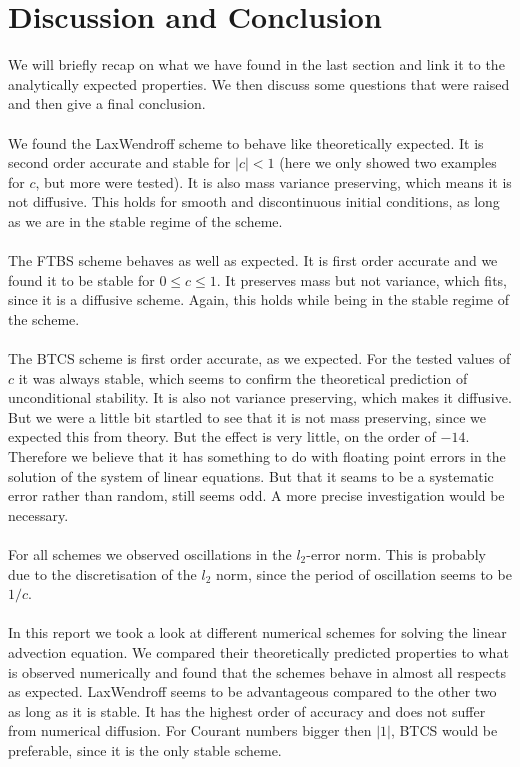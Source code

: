 \section{Discussion and Conclusion}\label{ch:discussion}
We will briefly recap on what we have found in the last section and link it to the analytically expected properties. We then discuss some questions that were raised and then give a final conclusion. \\ \\
We found the LaxWendroff scheme to behave like theoretically expected. It is second order accurate and stable for $|c|<1$ (here we only showed two examples for $c$, but more were tested). It is also mass variance preserving, which means it is not diffusive. This holds for smooth and discontinuous initial conditions, as long as we are in the stable regime of the scheme. \\ \\
The FTBS scheme behaves as well as expected. It is first order accurate and we found it to be stable for $0\leq c \leq 1 $. It preserves mass but not variance, which fits, since it is a diffusive scheme. Again, this holds while being in the stable regime of the scheme.  \\ \\
The BTCS scheme is first order accurate, as we expected. For the tested values of $c$ it was always stable, which seems to confirm the theoretical prediction of unconditional stability. It is also not variance preserving, which makes it diffusive.\\
 But we were a little bit startled to see that it is not mass preserving, since we expected this from theory. But the effect is very little, on the order of $-14$. Therefore we believe that it has something to do with floating point errors in the solution of the system of linear equations. But that it seams to be a systematic error rather than random, still seems odd. A more precise investigation would be necessary. \\ \\
 For all schemes we observed oscillations in the $l_2$-error norm. This is probably due to the discretisation of the $l_2$ norm, since the period of oscillation seems to be $1/c$. \\ \\
 
 In this report we took a look at different numerical schemes for solving the linear advection equation. We compared their theoretically predicted properties to what is observed numerically and found that the schemes behave in almost all respects as expected. LaxWendroff seems to be advantageous compared to the other two as long as it is stable. It has the highest order of accuracy and does not suffer from numerical diffusion. For Courant numbers bigger then $|1|$, BTCS would be preferable, since it is the only stable scheme. 